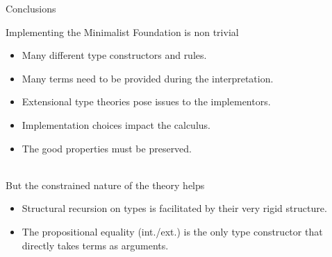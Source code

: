 \documentclass{beamer}
\begin{document}
\begin{frame}[fragile]{Conclusions}
%

  Implementing the Minimalist Foundation is non trivial
   \begin{itemize}
   	\item Many different type constructors and rules.
    \item Many terms need to be provided during the interpretation.
    \item Extensional type theories pose issues to the implementors.
    \item Implementation choices impact the calculus.
    \item The good properties must be preserved.
   \end{itemize}
	
	~\\
	
	But the constrained nature of the theory helps
	\begin{itemize}
		\item Structural recursion on types is facilitated by their very rigid structure.
		\item The propositional equality (int./ext.) is the only type constructor that directly takes terms as arguments.
		
	\end{itemize}
\end{frame}
\end{document}
